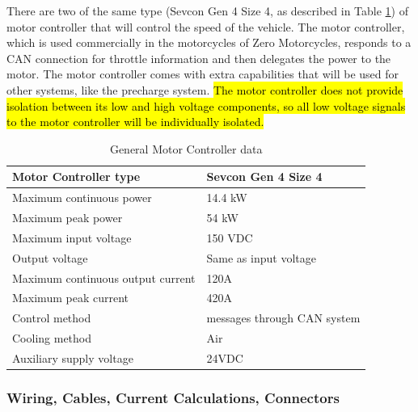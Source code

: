 \documentclass{article}
\DeclareRobustCommand{\hlr}[1]{{\sethlcolor{red}\hl{#1}}}
\begin{document}
            There are two of the same type (Sevcon Gen 4 Size 4, as described in Table \ref{MC}) of motor controller that will control the speed of the vehicle. The motor controller, which is used commercially in the motorcycles of Zero Motorcycles, responds to a CAN connection for throttle information and then delegates the power to the motor. The motor controller comes with extra capabilities that will be used for other systems, like the precharge system. \hlr{The motor controller does not provide isolation between its low and high voltage components, so all low voltage signals to the motor controller will be individually isolated.} 
            
            \begin{table}[H]
            \centering
            \begin{tabular}{|l|l|}
            \hline
            Motor Controller type & Sevcon Gen 4 Size 4 \\ \hline
            Maximum continuous power & 14.4 kW \\ \hline
            Maximum peak power & 54 kW \\ \hline
            Maximum input voltage & 150 VDC \\ \hline
            Output voltage & Same as input voltage \\ \hline
            Maximum continuous output current & 120A \\ \hline
            Maximum peak current & 420A \\ \hline
            Control method & messages through CAN system \\ \hline
            Cooling method & Air \\ \hline
            Auxiliary supply voltage & 24VDC \\ \hline
            \end{tabular}
            \caption{General Motor Controller data}
            \label{MC}
            \end{table}

        \subsubsection{Wiring, Cables, Current Calculations, Connectors} \label{mcwire}

            
\end{document}
